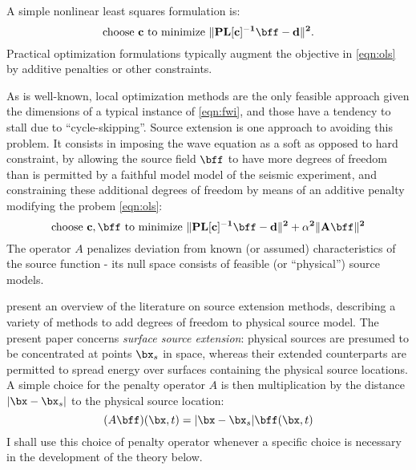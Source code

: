 A simple nonlinear least squares formulation is:
\begin{equation}
\label{eqn:ols}
\mbox{choose } \bf{c} \mbox{ to minimize } \|PL[\bf{c}]^{-1}\bff -d \|^2.
\end{equation}
Practical optimization formulations typically augment the objective in
\ref{eqn:ols} by additive penalties or other constraints.

As is well-known, local optimization methods are the only feasible
approach given the dimensions of a typical instance of \ref{eqn:fwi},
and those have a tendency to stall due to ``cycle-skipping''. Source
extension is one approach to avoiding this problem. It consists in
imposing the wave equation as a soft as opposed to hard constraint, by
allowing the source field $\bff$ to have more degrees of freedom than
is permitted by a faithful model model of the seismic experiment, and
constraining these additional degrees of freedom by means of an
additive penalty modifying the probem \ref{eqn:ols}:
\begin{equation}
\label{eqn:esi}
\mbox{choose } \bf{c}, \bff \mbox{ to minimize } \|PL[\bf{c}]^{-1}\bff -d \|^2 + \alpha^2 \|A\bff\|^2 
\end{equation}
The operator $A$ penalizes deviation from known (or assumed)
characteristics of the source function - its null space consists of
feasible (or ``physical'') source models.

\cite{HuangNammourSymesDollizal:SEG19} present an overview of the
literature on source extension methods, describing a variety of
methods to add degrees of freedom to physical source model. The present paper
concerns {\em surface source extension}: physical sources are
presumed to be concentrated at points $\bx_s$ in space, whereas their extended
counterparts are permitted to spread energy over surfaces containing
the physical source locations. A simple choice for the penalty
operator $A$ is then multiplication by the distance $|\bx-\bx_s|$ to the physical
source location:
\begin{equation}
  \label{eqn:penop}
  (A\bff)(\bx,t) = |\bx-\bx_s|\bff(\bx,t)
\end{equation}
I shall use this choice of penalty operator whenever a specific choice
is necessary in the development of the theory below.

